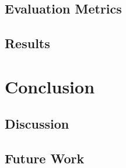 \documentclass[UKenglish, a4paper]{ifimaster}
\begin{document}
    \chapter{Evaluation Metrics}
    \chapter{Results}


\part{Conclusion}
    \chapter{Discussion}
    \chapter{Future Work}


\backmatter{}
\printbibliography{}
\end{document}
